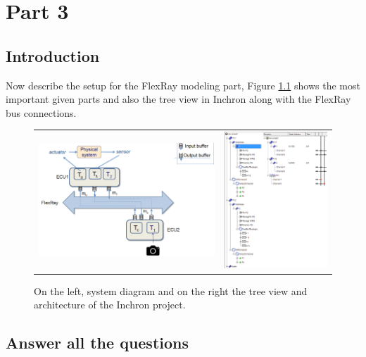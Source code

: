 \chapter{Part 3}

\section{Introduction}

Now describe the setup for the FlexRay modeling part, Figure \ref{fig:FRdia} shows the most important given parts and also the tree view in Inchron along with the FlexRay bus connections.

\begin{figure}[h!]
	\begin{center}
		
			\begin{tabular}{cc}
				\includegraphics[width=0.5\linewidth]{img/FR-diagram} & \includegraphics[width=0.35\linewidth]{img/FR-setup}	\\
			\end{tabular}
			\caption{On the left, system diagram and on the right the tree view and architecture of the Inchron project. }
		\label{fig:FRdia}
	\end{center}
\end{figure}


\section{Answer all the questions}




